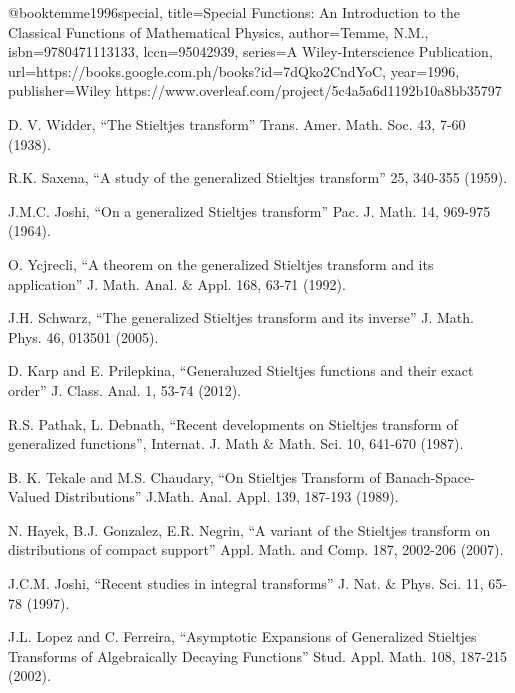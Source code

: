 \begin{thebibliography}{00}

@book{temme1996special,
  title={Special Functions: An Introduction to the Classical Functions of Mathematical Physics},
  author={Temme, N.M.},
  isbn={9780471113133},
  lccn={95042939},
  series={A Wiley-Interscience Publication},
  url={https://books.google.com.ph/books?id=7dQko2CndYoC},
  year={1996},
  publisher={Wiley}
}
https://www.overleaf.com/project/5c4a5a6d1192b10a8bb35797





 D. V. Widder, ``The Stieltjes transform'' Trans. Amer. Math. Soc. 43, 7-60 (1938).

 R.K. Saxena, ``A study of the generalized Stieltjes transform'' 25, 340-355 (1959).

 J.M.C. Joshi, ``On a generalized Stieltjes transform'' Pac. J. Math. 14, 969-975 (1964).

 O. Ycjrecli, ``A theorem on the generalized Stieltjes transform and its application'' J. Math. Anal. \& Appl. 168, 63-71 (1992).

 J.H. Schwarz, ``The generalized Stieltjes transform and its inverse'' J. Math. Phys. 46, 013501 (2005).

 D. Karp and E. Prilepkina, ``Generaluzed Stieltjes functions and their exact order'' J. Class. Anal. 1, 53-74 (2012).

 R.S. Pathak, L. Debnath, ``Recent developments on Stieltjes transform of generalized functions'', Internat. J. Math \& Math. Sci. 10, 641-670 (1987).

 B. K. Tekale and M.S. Chaudary, ``On Stieltjes Transform of
Banach-Space-Valued Distributions'' J.Math. Anal. Appl. 139, 187-193 (1989).

 N. Hayek, B.J. Gonzalez, E.R. Negrin, ``A variant of the Stieltjes transform on distributions of compact support'' Appl. Math. and Comp. 187, 2002-206 (2007).

 J.C.M. Joshi, ``Recent studies in integral transforms'' J. Nat. \& Phys. Sci. 11, 65-78 (1997).

 J.L. Lopez and C. Ferreira, ``Asymptotic Expansions of Generalized Stieltjes Transforms of Algebraically Decaying Functions'' Stud. Appl. Math. 108, 187-215 (2002).


\end{thebibliography}
